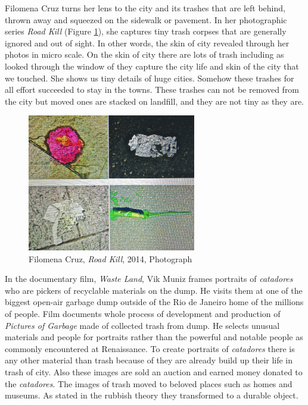 Filomena Cruz turns her lens to the city and its trashes that are left behind, thrown away and squeezed on the sidewalk or pavement. In her photographic series \textit{Road Kill} (Figure \ref{fig:FilomenaCruz_RoadKill_ReVista}), she captures tiny trash corpses that are generally ignored and out of sight. In other words, the skin of city revealed through her photos in micro scale. On the skin of city there are lots of trash including  as looked through the window of they capture the city life and skin of the city that we touched. She shows us tiny details of huge cities. Somehow these trashes for all effort succeeded to stay in the towns. These trashes can not be removed from the city but moved ones are stacked on landfill, and they are not tiny as they are.

\begin{figure}[h!]
  \centering
  \includegraphics[height=6cm]{graphics/FilomenaCruz_RoadKill_ReVista.jpg}
  \caption{Filomena Cruz, \textit{Road Kill}, 2014, Photograph}
  \label{fig:FilomenaCruz_RoadKill_ReVista}
\end{figure}

In the documentary film, \textit{Waste Land}, Vik Muniz frames portraits of \textit{catadores} who are pickers of recyclable materials on the dump. He visits them at one of the biggest open-air garbage dump outside of the Rio de Janeiro home of the millions of people. Film documents whole process of development and production of \textit{Pictures of Garbage} made of collected trash from dump. He selects unusual materials and people for portraits rather than the powerful and notable people as commonly encountered at Renaissance. To create portraits of \textit{catadores} there is any other material than trash because of they are already build up their life in trash of city. Also these images are sold an auction and earned money donated to the \textit{catadores}. The images of trash moved to beloved places such as homes and museums. As stated in the rubbish theory they transformed to a durable object.

